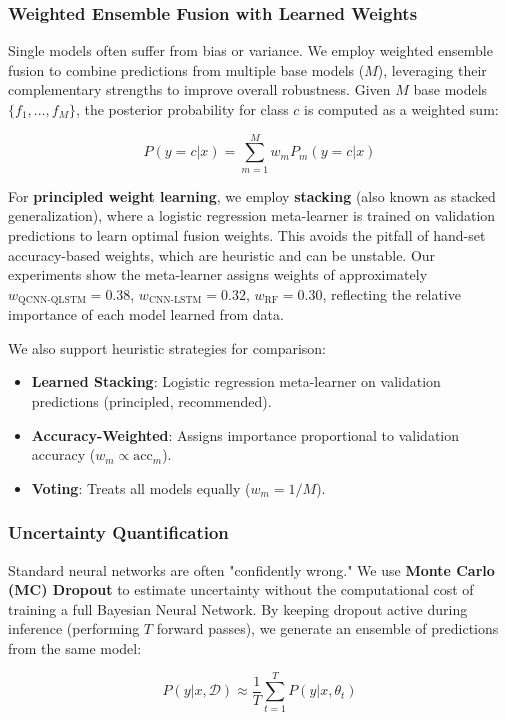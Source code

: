 \documentclass[conference]{IEEEtran}
\begin{document}
\subsubsection{Weighted Ensemble Fusion with Learned Weights}
Single models often suffer from bias or variance. We employ weighted ensemble fusion to combine predictions from multiple base models ($M$), leveraging their complementary strengths to improve overall robustness.
Given $M$ base models $\{f_1, ..., f_M\}$, the posterior probability for class $c$ is computed as a weighted sum:

\begin{equation}
P(y=c|x) = \sum_{m=1}^{M} w_m P_m(y=c|x)
\end{equation}

For \textbf{principled weight learning}, we employ \textbf{stacking} (also known as stacked generalization), where a logistic regression meta-learner is trained on validation predictions to learn optimal fusion weights. This avoids the pitfall of hand-set accuracy-based weights, which are heuristic and can be unstable. Our experiments show the meta-learner assigns weights of approximately $w_{\text{QCNN-QLSTM}}=0.38$, $w_{\text{CNN-LSTM}}=0.32$, $w_{\text{RF}}=0.30$, reflecting the relative importance of each model learned from data.

We also support heuristic strategies for comparison:
\begin{itemize}
    \item \textbf{Learned Stacking}: Logistic regression meta-learner on validation predictions (principled, recommended).
    \item \textbf{Accuracy-Weighted}: Assigns importance proportional to validation accuracy ($w_m \propto \text{acc}_m$).
    \item \textbf{Voting}: Treats all models equally ($w_m = 1/M$).
\end{itemize}

\subsubsection{Uncertainty Quantification}
Standard neural networks are often "confidently wrong." We use \textbf{Monte Carlo (MC) Dropout} to estimate uncertainty without the computational cost of training a full Bayesian Neural Network. By keeping dropout active during inference (performing $T$ forward passes), we generate an ensemble of predictions from the same model:

\begin{equation}
P(y|x,\mathcal{D}) \approx \frac{1}{T} \sum_{t=1}^{T} P(y|x,\theta_t)
\end{equation}
\end{document}

